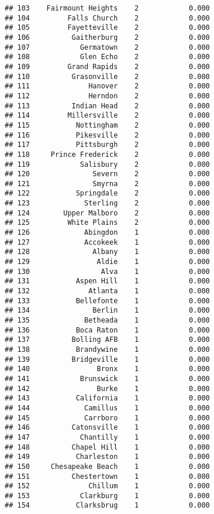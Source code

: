 \documentclass[]{article}
\begin{document}
\begin{verbatim}
## 103    Fairmount Heights    2            0.000
## 104         Falls Church    2            0.000
## 105         Fayetteville    2            0.000
## 106          Gaitherburg    2            0.000
## 107            Germatown    2            0.000
## 108            Glen Echo    2            0.000
## 109         Grand Rapids    2            0.000
## 110          Grasonville    2            0.000
## 111              Hanover    2            0.000
## 112              Herndon    2            0.000
## 113          Indian Head    2            0.000
## 114         Millersville    2            0.000
## 115           Nottingham    2            0.000
## 116           Pikesville    2            0.000
## 117           Pittsburgh    2            0.000
## 118     Prince Frederick    2            0.000
## 119            Salisbury    2            0.000
## 120               Severn    2            0.000
## 121               Smyrna    2            0.000
## 122           Springdale    2            0.000
## 123             Sterling    2            0.000
## 124        Upper Malboro    2            0.000
## 125         White Plains    2            0.000
## 126             Abingdon    1            0.000
## 127             Accokeek    1            0.000
## 128               Albany    1            0.000
## 129                Aldie    1            0.000
## 130                 Alva    1            0.000
## 131           Aspen Hill    1            0.000
## 132              Atlanta    1            0.000
## 133           Bellefonte    1            0.000
## 134               Berlin    1            0.000
## 135             Betheada    1            0.000
## 136           Boca Raton    1            0.000
## 137          Bolling AFB    1            0.000
## 138           Brandywine    1            0.000
## 139          Bridgeville    1            0.000
## 140                Bronx    1            0.000
## 141            Brunswick    1            0.000
## 142                Burke    1            0.000
## 143           California    1            0.000
## 144             Camillus    1            0.000
## 145             Carrboro    1            0.000
## 146          Catonsville    1            0.000
## 147            Chantilly    1            0.000
## 148          Chapel Hill    1            0.000
## 149           Charleston    1            0.000
## 150     Chesapeake Beach    1            0.000
## 151          Chestertown    1            0.000
## 152              Chillum    1            0.000
## 153            Clarkburg    1            0.000
## 154           Clarksbrug    1            0.000

\end{verbatim}
\end{document}
